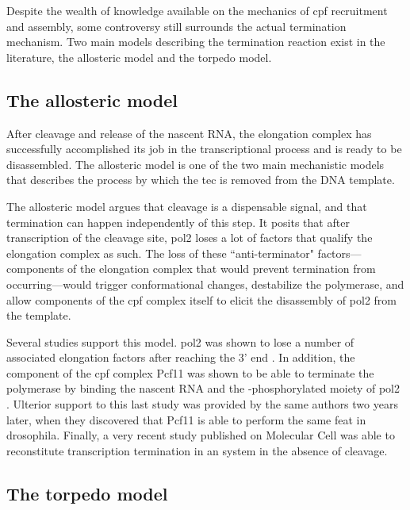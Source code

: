 Despite the wealth of knowledge available on the mechanics of \gls{cpf} recruitment and assembly, some controversy still surrounds the actual termination mechanism.
Two main models describing the termination reaction exist in the literature, the allosteric model and the torpedo model.

\subsection{The allosteric model}

After cleavage and release of the nascent RNA, the elongation complex has successfully accomplished its job in the transcriptional process and is ready to be disassembled.
The allosteric model is one of the two main mechanistic models that describes the process by which the \gls{tec} is removed from the DNA template.

The allosteric model argues that cleavage is a dispensable signal, and that termination can happen independently of this step.
It posits that after transcription of the cleavage site, \gls{pol2} loses a lot of factors that qualify the elongation complex as such.
The loss of these ``anti-terminator" factors---components of the elongation complex that would prevent termination from occurring---would trigger conformational changes, destabilize the polymerase, and allow components of the \gls{cpf} complex itself to elicit the disassembly of \gls{pol2} from the template.

Several studies support this model. 
\gls{pol2} was shown to lose a number of associated elongation factors after reaching the 3' end \citep{kim:2004:transitions}.
In addition, the component of the \gls{cpf} complex Pcf11 was shown to be able to terminate the polymerase \invitro{} by binding the nascent RNA and the \sert{}-phosphorylated moiety of \gls{pol2} \citep{zhang:2005:ctddependent}.
Ulterior support to this last study was provided by the same authors two years later, when they discovered that Pcf11 is able to perform the same feat in drosophila\citep{zhang:2006:pcf11}.
Finally, a very recent study published on Molecular Cell was able to reconstitute transcription termination in an \invitro{} system in the absence of cleavage\citep{zhang:2015:polya}.

\subsection{The torpedo model}



